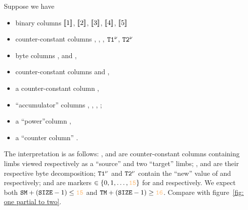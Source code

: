 Suppose we have
\begin{itemize}
	\item binary columns $[\![1]\!]$, $[\![2]\!]$, $[\![3]\!]$, $[\![4]\!]$, $[\![5]\!]$
	\item counter-constant columns \source{}, \targetOne{}, \targetTwo{}, $\texttt{T1}{}^{\nu}{}$, $\texttt{T2}{}^{\nu}{}$
	\item byte columns \source{}\byte{}, \targetOne{}\byte{} and \targetTwo{}\byte{},
	\item counter-constant columns \source{}\mark{} and \targetOne{}\mark{},
	\item a counter-constant column \size{},
	\item ``accumulator'' columns , , , ;
	\item a ``power''column ,
	\item a ``counter column'' \ct{}.
\end{itemize}
The interpretation is as follows: 
\source{}, \targetOne{} and \targetTwo{} are counter-constant columns containing limbs viewed respectively as a ``source'' and two ``target'' limbs; 
\source{}\byte{}, \targetOne{}\byte{} and \targetTwo{}\byte{} are their respective byte decomposition;
$\texttt{T1}{}^{\nu}$ and $\texttt{T2}{}^{\nu}$ contain the ``new'' value of \targetOne{} and \targetTwo{} respectively; 
\source{}\mark{} and \target{}\mark{} are markers $\in\{0,1,\dots,\llargeMO\}$ for \source{} and \targetOne{} respectively.
We expect both
$\source{}\mark{} + (\size{}-1)\leq \llargeMO$ and
$\target{}\mark{} + (\size{}-1)\geq \llarge$.
Compare with figure~\ref{fig: one partial to two}.

